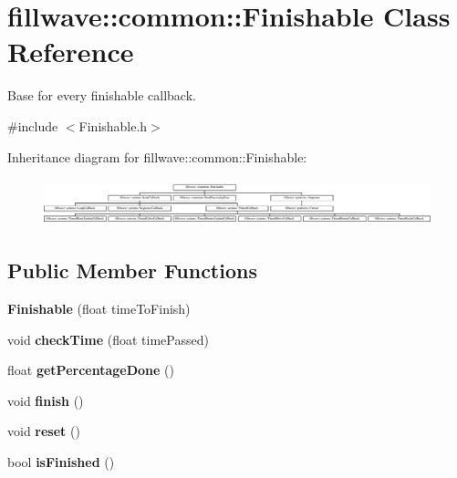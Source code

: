 \hypertarget{classfillwave_1_1common_1_1Finishable}{}\section{fillwave\+:\+:common\+:\+:Finishable Class Reference}
\label{classfillwave_1_1common_1_1Finishable}


Base for every finishable callback.  




{\ttfamily \#include $<$Finishable.\+h$>$}

Inheritance diagram for fillwave\+:\+:common\+:\+:Finishable\+:\begin{figure}[H]
\begin{center}
\leavevmode
\includegraphics[height=1.377614cm]{classfillwave_1_1common_1_1Finishable}
\end{center}
\end{figure}
\subsection*{Public Member Functions}
\begin{DoxyCompactItemize}
\item 
\hypertarget{classfillwave_1_1common_1_1Finishable_a4e82504fc8af19c480170ec836d0b400}{}{\bfseries Finishable} (float time\+To\+Finish)\label{classfillwave_1_1common_1_1Finishable_a4e82504fc8af19c480170ec836d0b400}

\item 
\hypertarget{classfillwave_1_1common_1_1Finishable_aecc37f0d5ed793ab1f446a6d11e8b29d}{}void {\bfseries check\+Time} (float time\+Passed)\label{classfillwave_1_1common_1_1Finishable_aecc37f0d5ed793ab1f446a6d11e8b29d}

\item 
\hypertarget{classfillwave_1_1common_1_1Finishable_ad48dac976fbf71183c07ae3866603cca}{}float {\bfseries get\+Percentage\+Done} ()\label{classfillwave_1_1common_1_1Finishable_ad48dac976fbf71183c07ae3866603cca}

\item 
\hypertarget{classfillwave_1_1common_1_1Finishable_a1b5ad3219468ddaa449f3330b2aa660c}{}void {\bfseries finish} ()\label{classfillwave_1_1common_1_1Finishable_a1b5ad3219468ddaa449f3330b2aa660c}

\item 
\hypertarget{classfillwave_1_1common_1_1Finishable_a79a1f23e168c734489973ce8cf2c373b}{}void {\bfseries reset} ()\label{classfillwave_1_1common_1_1Finishable_a79a1f23e168c734489973ce8cf2c373b}

\item 
\hypertarget{classfillwave_1_1common_1_1Finishable_a80cafe47a876c4c20db39a792d6edb98}{}bool {\bfseries is\+Finished} ()\label{classfillwave_1_1common_1_1Finishable_a80cafe47a876c4c20db39a792d6edb98}

\end{DoxyCompactItemize}
